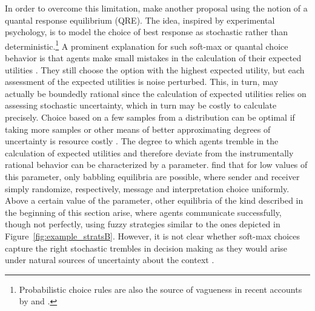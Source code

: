 \documentclass[a4paper]{article}
\begin{document}
In order to overcome this limitation, \citeauthor{franke_vagueness_2011} make another proposal using the notion of a quantal response equilibrium (QRE).
The idea, inspired by experimental psychology, is to model the choice of best response as stochastic rather than deterministic.\footnote{Probabilistic choice rules are also the source of vagueness in recent accounts by \textcite{LassiterGoodman2015:Adjectival-vagu} and \textcite{QingFranke2014:Gradable-Adject}.} 
A prominent explanation for such soft-max or quantal choice behavior is that agents make small mistakes in the calculation of their expected utilities \parencite{Train2009:Discrete-Choice}. 
They still choose the option with the highest expected utility, but each assessment of the expected utilities is noise perturbed.
This, in turn, may actually be boundedly rational since the calculation of expected utilities relies on assessing stochastic uncertainty, which in turn may be costly to calculate precisely. 
Choice based on a few samples from a distribution can be optimal if taking more samples or other means of better approximating degrees of uncertainty is resource costly \parencite[\emph{e.g.}][]{VulGoodman2014:One-and-Done-Op,SanbornChater2016:Bayesian-Brains}.
The degree to which agents tremble in the calculation of expected utilities and therefore deviate from the instrumentally rational behavior can be characterized by a parameter.
\citeauthor{franke_vagueness_2011} find that for low values of this parameter, only babbling equilibria are possible, where sender and receiver simply randomize, respectively, message and interpretation choice uniformly.
Above a certain value of the parameter, other equilibria of the kind described in the beginning of this section arise, where agents communicate successfully, though not perfectly, using fuzzy strategies similar to the ones depicted in Figure~\ref{fig:example_stratsB}. However, it is not clear whether soft-max choices capture the right stochastic trembles in decision making as they would arise under natural sources of uncertainty about the context \parencite[see][]{franke_vagueness_2017}.
\end{document}

